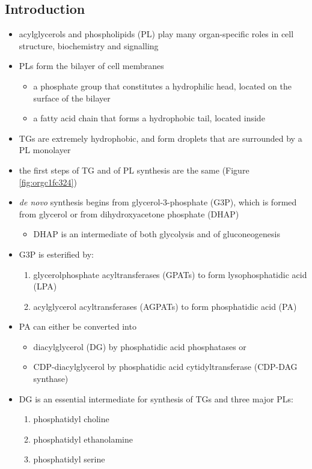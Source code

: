 \documentclass{scrartcl}
\begin{document}
\subsection{Introduction}
\label{sec:org2012f58}
\begin{itemize}
\item acylglycerols and phospholipids (PL) play many organ-specific roles
in cell structure, biochemistry and signalling
\item PLs form the bilayer of cell membranes
\begin{itemize}
\item a phosphate group that constitutes a hydrophilic head, located on the surface of the bilayer
\item a fatty acid chain that forms a hydrophobic tail, located inside
\end{itemize}
\item TGs are extremely hydrophobic, and form droplets
that are surrounded by a PL monolayer
\item the first steps of TG and of PL synthesis are the same (Figure \ref{fig:orgc1fc324})
\item \emph{de novo} synthesis begins from glycerol-3-phosphate (G3P), which is
formed from glycerol or from dihydroxyacetone phosphate (DHAP)
\begin{itemize}
\item DHAP is an intermediate of both glycolysis and of gluconeogenesis
\end{itemize}
\item G3P is esterified by:
\begin{enumerate}
\item glycerolphosphate acyltransferases (GPATs) to form lysophosphatidic acid (LPA)
\item acylglycerol acyltransferases (AGPATs) to form phosphatidic acid (PA)
\end{enumerate}
\item PA can either be converted into
\begin{itemize}
\item diacylglycerol (DG) by phosphatidic acid phosphatases or
\item CDP-diacylglycerol by phosphatidic acid cytidyltransferase (CDP-DAG synthase)
\end{itemize}
\item DG is an essential intermediate for synthesis of TGs and three major PLs:
\begin{enumerate}
\item phosphatidyl choline
\item phosphatidyl ethanolamine
\item phosphatidyl serine
\end{enumerate}
\end{itemize}
\end{document}
